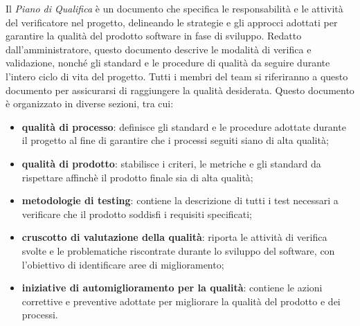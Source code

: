 Il \textit{Piano di Qualifica} è un documento che specifica le responsabilità e le attività del verificatore nel progetto, delineando le strategie e gli approcci adottati per garantire la qualità del prodotto software in fase di sviluppo. Redatto dall’amministratore, questo documento descrive le modalità di verifica e validazione, nonché gli standard e le procedure di qualità da seguire durante l'intero ciclo di vita del progetto. Tutti i membri del team si riferiranno a questo documento per assicurarsi di raggiungere la qualità desiderata. Questo documento è organizzato in diverse sezioni, tra cui:
\begin{itemize}
	\item \textbf{qualità di processo}: definisce gli standard e le procedure adottate durante il progetto al fine di garantire che i processi seguiti siano di alta qualità;
	\item \textbf{qualità di prodotto}: stabilisce i criteri, le metriche e gli standard da rispettare affinchè il prodotto finale sia di alta qualità;
	\item \textbf{metodologie di testing}: contiene la descrizione di tutti i test necessari a verificare che il prodotto soddisfi i requisiti specificati;
	\item \textbf{cruscotto di valutazione della qualità}: riporta le attività di verifica svolte e le problematiche riscontrate durante lo sviluppo del software, con l'obiettivo di identificare aree di miglioramento;
	\item \textbf{iniziative di automiglioramento per la qualità}: contiene le azioni correttive e preventive adottate per migliorare la qualità del prodotto e dei processi.
\end{itemize}



